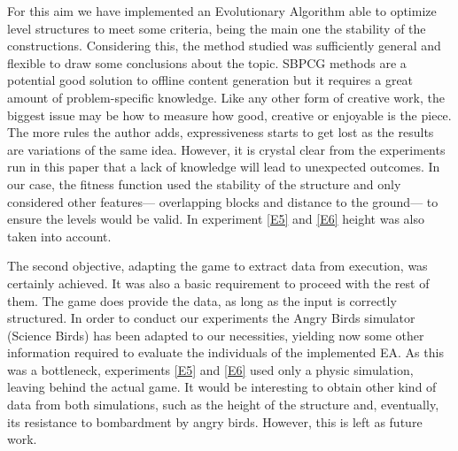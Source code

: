 \documentclass[sigconf]{acmart}
\begin{document}
For this aim we have implemented an Evolutionary Algorithm able to optimize 
level structures to meet some criteria, being the main one the stability of the 
constructions.
Considering this, the method studied was
sufficiently general and flexible to draw some conclusions about the
topic. SBPCG methods are a potential good solution to offline content
generation but it requires a great amount of problem-specific
knowledge. Like any other form of creative work, the biggest issue may
be how to measure how good, creative or enjoyable is the piece. The
more rules the author adds, expressiveness starts to get lost as the
results are variations of the same idea. However, it is crystal clear
from the experiments run in this paper that a lack of knowledge
will lead to unexpected outcomes.
In our case, the fitness function used the 
stability of the structure and only considered other features--- overlapping 
blocks and distance to the ground--- to ensure the levels would be valid.
In experiment \ref{E5} and \ref{E6} height was also taken into account.


The second objective, adapting the game to extract data from execution, was 
certainly achieved. It was also a basic requirement to proceed with the rest of 
them. The game does provide the data, as long as the input is correctly 
structured. 
In order to conduct our experiments the Angry Birds simulator (Science Birds) 
has been adapted to our necessities, yielding now some  other information 
required to evaluate the individuals of the implemented EA. As this was a 
bottleneck, experiments \ref{E5} and \ref{E6} used only a physic simulation,
leaving behind the actual game.
It would be interesting to obtain other kind of data from both simulations,
such as the height of the structure and, eventually, its resistance to
bombardment by angry birds. However, this is left as future work.
\end{document}

